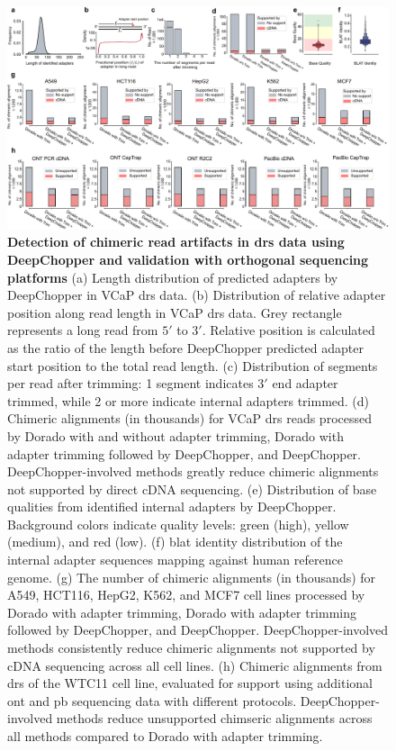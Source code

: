 \documentclass[pdflatex,sn-nature, lineno]{sn-jnl}%
\begin{document}
\begin{figure}[!ht]
	\includegraphics[height=0.6\columnwidth]{finals/figure2}
	\caption{{\bf Detection of chimeric read artifacts in \gls{drs} data using DeepChopper and validation with orthogonal sequencing platforms}  (a) Length distribution of predicted adapters by DeepChopper in VCaP \gls{drs} data. (b) Distribution of relative adapter position along read length in VCaP \gls{drs} data. Grey rectangle represents a long read from $5'$ to $3'$. Relative position is calculated as the ratio of the length before DeepChopper predicted adapter start position to the total read length. (c) Distribution of segments per read after trimming: 1 segment indicates $3'$ end adapter trimmed, while 2 or more indicate internal adapters trimmed. (d) Chimeric alignments (in thousands) for VCaP \gls{drs} reads processed by Dorado with and without adapter trimming, Dorado with adapter trimming followed by DeepChopper, and DeepChopper. DeepChopper-involved methods greatly reduce chimeric alignments not supported by direct cDNA sequencing. (e) Distribution of base qualities from identified internal adapters by DeepChopper. Background colors indicate quality levels: green (high), yellow (medium), and red (low). (f) \gls{blat} identity distribution of the internal adapter sequences mapping against human reference genome. (g) The number of chimeric alignments (in thousands) for A549, HCT116, HepG2, K562, and MCF7 cell lines processed by Dorado with adapter trimming, Dorado with adapter trimming followed by DeepChopper, and DeepChopper. DeepChopper-involved methods consistently reduce chimeric alignments not supported by cDNA sequencing across all cell lines. (h) Chimeric alignments from \gls{drs} of the WTC11 cell line, evaluated for support using additional \gls{ont} and \gls{pb} sequencing data with different protocols. DeepChopper-involved methods reduce unsupported chimseric alignments across all methods compared to Dorado with adapter trimming.}\label{fig:f2}
\end{figure}
\end{document}
